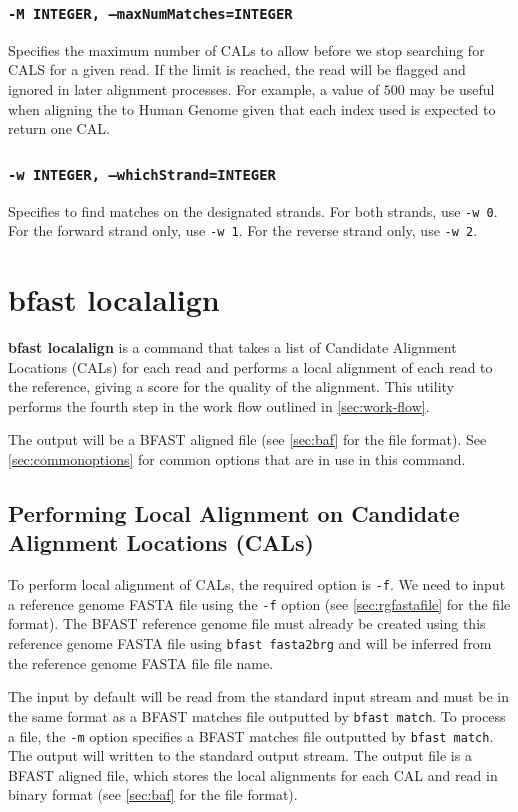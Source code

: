 \documentclass[a4paper,12pt]{book}
\newcommand{\TT}[1]{{\tt #1}} %
\newcommand{\BF}[1]{{\bf #1}} %
\newcommand{\rGFF}{reference genome FASTA file}
\newcommand{\BRGF}{BFAST reference genome file} %
\newcommand{\BMF}{BFAST matches file} %
\newcommand{\BAF}{BFAST aligned file} %
\begin{document}
\subsubsection{\TT{-M INTEGER, --maxNumMatches=INTEGER}}
Specifies the maximum number of CALs to allow before we stop searching for CALS for a given read.
If the limit is reached, the read will be flagged and ignored in later alignment processes.
For example, a value of $500$ may be useful when aligning the to Human Genome given that each index used is expected to return one CAL.
\subsubsection{\TT{-w INTEGER, --whichStrand=INTEGER}}
Specifies to find matches on the designated strands.
For both strands, use \TT{-w 0}.
For the forward strand only, use \TT{-w 1}.
For the reverse strand only, use \TT{-w 2}.

\section{bfast localalign}
\label{sec:localalign}
\BF{bfast localalign} is a command that takes a list of Candidate Alignment Locations (CALs) for each read and performs a local alignment of each read to the reference, giving a score for the quality of the alignment.
This utility performs the fourth step in the work flow outlined in \autoref{sec:work-flow}.

The output will be a \BAF{} (see \autoref{sec:baf} for the file format).
See \autoref{sec:commonoptions} for common options that are in use in this command.

\subsection{Performing Local Alignment on Candidate Alignment Locations (CALs)}
\label{sec:local-alignment}
To perform local alignment of CALs, the required option is \TT{-f}.
We need to input a \rGFF{} using the \TT{-f} option (see \autoref{sec:rgfastafile} for the file format).
The \BRGF{} must already be created using this \rGFF{} using \TT{bfast fasta2brg} and will be inferred from the \rGFF{} file name.

The input by default will be read from the standard input stream and must be in the same format as a \BMF{} outputted by \TT{bfast match}.
To process a file, the \TT{-m} option specifies a \BMF{} outputted by \TT{bfast match}.
The output will written to the standard output stream.
The output file is a \BAF{}, which stores the local alignments for each CAL and read in binary format (see \autoref{sec:baf} for the file format).
\end{document}
